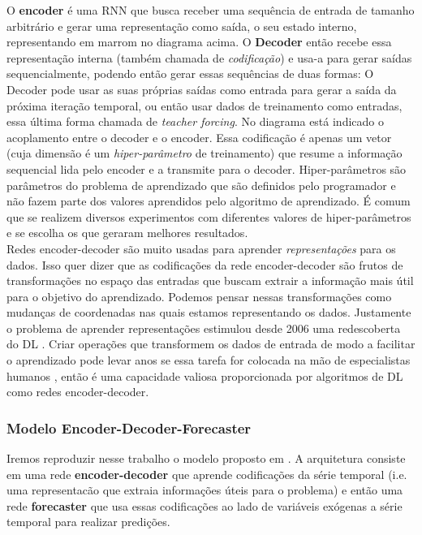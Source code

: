 O \textbf{encoder} é uma RNN que busca receber uma sequência de entrada de
tamanho arbitrário e gerar uma representação como saída, o seu estado interno,
representando em marrom no diagrama acima. O \textbf{Decoder} então recebe essa representação interna (também chamada
de \textit{codificação}) e usa-a para gerar saídas sequencialmente, podendo
então gerar essas sequências de duas formas: O Decoder pode usar as suas próprias saídas
como entrada para gerar a saída da próxima iteração temporal, ou então usar dados de treinamento como
entradas, essa última forma chamada de \textit{teacher forcing}. No diagrama
está indicado o acoplamento entre o decoder e o encoder. Essa codificação é apenas
um vetor (cuja dimensão é um \textit{hiper-parâmetro} de treinamento) que resume a
informação sequencial lida pelo encoder e a transmite para o decoder.
Hiper-parâmetros são parâmetros do problema de aprendizado que são definidos
pelo programador e não fazem parte dos valores aprendidos pelo algoritmo de
aprendizado. É comum que se realizem diversos experimentos com diferentes
valores de hiper-parâmetros e se escolha os que geraram melhores resultados. 
\\

Redes encoder-decoder são muito usadas para aprender \textit{representações} para os
dados. Isso quer dizer que as codificações da rede encoder-decoder são frutos de
transformações no espaço das entradas que buscam extrair a informação mais útil
para o objetivo do aprendizado. Podemos pensar nessas transformações como
mudanças de coordenadas nas quais estamos representando os dados. Justamente o problema de aprender
representações estimulou desde 2006 uma redescoberta do DL \citep{dlbook}. Criar
operações que transformem os dados de entrada de modo a facilitar o aprendizado
pode levar anos se essa tarefa for colocada na mão de especialistas humanos
\citep{dlbook}, então é uma capacidade valiosa proporcionada por algoritmos de
DL como redes encoder-decoder. \\



\subsubsection{Modelo Encoder-Decoder-Forecaster}

Iremos reproduzir nesse trabalho o modelo proposto em \cite{ubertime}. A
arquitetura consiste em uma rede \textbf{encoder-decoder} que aprende codificações da
série temporal (i.e. uma representacão que extraia informações úteis para o
problema) e então uma rede \textbf{forecaster} que usa essas codificações ao lado de
variáveis exógenas a série temporal para realizar predições.  


